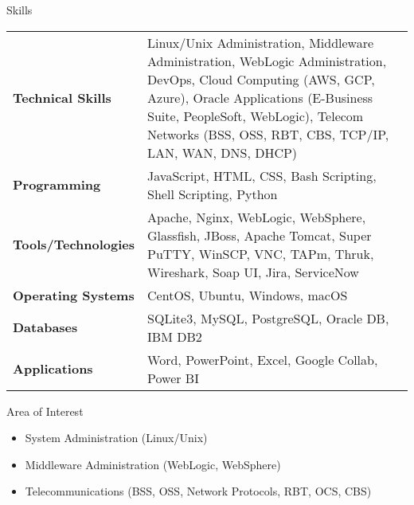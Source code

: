 \documentclass{resume} %
\begin{document}

\begin{rSection}{Skills}

\begin{tabular}{ @{} >{\bfseries}l @{\hspace{6ex}} l }
Technical Skills & Linux/Unix Administration, Middleware Administration, WebLogic Administration, DevOps, Cloud Computing (AWS, GCP, Azure), Oracle Applications (E-Business Suite, PeopleSoft, WebLogic), Telecom Networks (BSS, OSS, RBT, CBS, TCP/IP, LAN, WAN, DNS, DHCP) \\
Programming & JavaScript, HTML, CSS, Bash Scripting, Shell Scripting, Python \\
Tools/Technologies & Apache, Nginx, WebLogic, WebSphere, Glassfish, JBoss, Apache Tomcat, Super PuTTY, WinSCP, VNC, TAPm, Thruk, Wireshark, Soap UI, Jira, ServiceNow \\
Operating Systems & CentOS, Ubuntu, Windows, macOS \\
Databases & SQLite3, MySQL, PostgreSQL, Oracle DB, IBM DB2 \\
Applications & Word, PowerPoint, Excel, Google Collab, Power BI \\
\end{tabular}
\end{rSection}


\begin{rSection}{Area of Interest}

\begin{itemize}
    \item System Administration (Linux/Unix)
    \item Middleware Administration (WebLogic, WebSphere)
    \item Telecommunications (BSS, OSS, Network Protocols, RBT, OCS, CBS)
\end{itemize}
\end{rSection}
\end{document}
